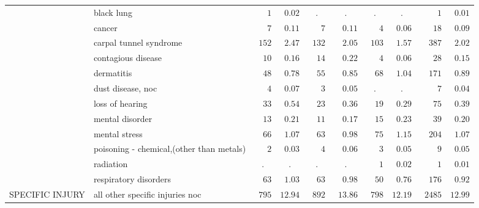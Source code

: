 \documentclass[9pt, oneside]{article}   	%
\begin{document}
\begin{longtable}{p{1.8in}p{2.2in}cccccccc}
 & black lung  & $\phantom{000}1$ & $\phantom{0}0.02$ & . & . & . & . & $\phantom{0000}1$ & $\phantom{0}0.01$ \\
 & cancer  & $\phantom{000}7$ & $\phantom{0}0.11$ & $\phantom{000}7$ & $\phantom{00}0.11$ & $\phantom{000}4$ & $\phantom{0}0.06$ & $\phantom{000}18$ & $\phantom{0}0.09$ \\
 & carpal tunnel syndrome  & $\phantom{0}152$ & $\phantom{0}2.47$ & $\phantom{0}132$ & $\phantom{00}2.05$ & $\phantom{0}103$ & $\phantom{0}1.57$ & $\phantom{00}387$ & $\phantom{0}2.02$ \\
 & contagious disease  & $\phantom{00}10$ & $\phantom{0}0.16$ & $\phantom{00}14$ & $\phantom{00}0.22$ & $\phantom{000}4$ & $\phantom{0}0.06$ & $\phantom{000}28$ & $\phantom{0}0.15$ \\
 & dermatitis  & $\phantom{00}48$ & $\phantom{0}0.78$ & $\phantom{00}55$ & $\phantom{00}0.85$ & $\phantom{00}68$ & $\phantom{0}1.04$ & $\phantom{00}171$ & $\phantom{0}0.89$ \\
 & dust disease, noc  & $\phantom{000}4$ & $\phantom{0}0.07$ & $\phantom{000}3$ & $\phantom{00}0.05$ & . & . & $\phantom{0000}7$ & $\phantom{0}0.04$ \\
 & loss of hearing  & $\phantom{00}33$ & $\phantom{0}0.54$ & $\phantom{00}23$ & $\phantom{00}0.36$ & $\phantom{00}19$ & $\phantom{0}0.29$ & $\phantom{000}75$ & $\phantom{0}0.39$ \\
 & mental disorder  & $\phantom{00}13$ & $\phantom{0}0.21$ & $\phantom{00}11$ & $\phantom{00}0.17$ & $\phantom{00}15$ & $\phantom{0}0.23$ & $\phantom{000}39$ & $\phantom{0}0.20$ \\
 & mental stress  & $\phantom{00}66$ & $\phantom{0}1.07$ & $\phantom{00}63$ & $\phantom{00}0.98$ & $\phantom{00}75$ & $\phantom{0}1.15$ & $\phantom{00}204$ & $\phantom{0}1.07$ \\
 & poisoning - chemical,(other than metals)  & $\phantom{000}2$ & $\phantom{0}0.03$ & $\phantom{000}4$ & $\phantom{00}0.06$ & $\phantom{000}3$ & $\phantom{0}0.05$ & $\phantom{0000}9$ & $\phantom{0}0.05$ \\
 & radiation  & . & . & . & . & $\phantom{000}1$ & $\phantom{0}0.02$ & $\phantom{0000}1$ & $\phantom{0}0.01$ \\
 & respiratory disorders  & $\phantom{00}63$ & $\phantom{0}1.03$ & $\phantom{00}63$ & $\phantom{00}0.98$ & $\phantom{00}50$ & $\phantom{0}0.76$ & $\phantom{00}176$ & $\phantom{0}0.92$ \\
SPECIFIC INJURY & all other specific injuries noc  & $\phantom{0}795$ & $12.94$ & $\phantom{0}892$ & $\phantom{0}13.86$ & $\phantom{0}798$ & $12.19$ & $\phantom{0}2485$ & $12.99$ \\

\end{longtable}
\end{document}
